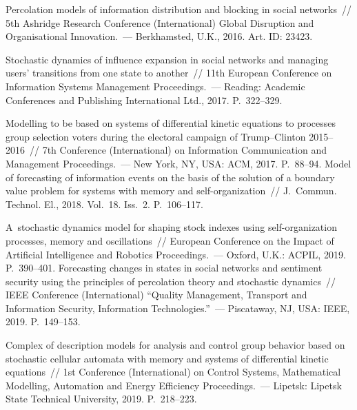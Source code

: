 \begin{multicols}{2}
{{\begin{thebibliography}{99}
 Percolation models of information distribution 
and blocking in social networks~// 5th Ashridge  Research Conference (International) 
Global Disruption and Organisational Innovation.~--- Berkhamsted, U.K., 2016. Art. ID: 
23423.

 Stochastic dynamics of influence expansion in social 
networks and managing users' transitions from one state to another~// 11th European Conference 
on Information Systems Management Proceedings.~--- Reading: Academic Conferences and 
Publishing International Ltd., 2017. P.~322--329. 

 Modelling to be based on systems of 
differential kinetic equations to processes group selection voters during the electoral campaign of 
Trump--Clinton 2015--2016~// 7th Conference (International) on Information Communication and 
Management Proceedings.~--- New York, NY, USA: ACM, 2017. P.~88--94.
 Model of forecasting of 
information events on the basis of the solution of a boundary value problem for systems with 
memory and self-organization~// J.~Commun. Technol. El., 2018. Vol.~18. 
Iss.~2. P.~106--117.


 A~stochastic dynamics model for shaping stock indexes 
using self-organization processes, memory and oscillations~// European Conference on the Impact 
of Artificial Intelligence and Robotics Proceedings.~--- Oxford, U.K.: ACPIL, 2019. P.~390--401.
 Forecasting changes in states in social networks and 
sentiment security using the principles of percolation theory and stochastic dynamics~// IEEE  
Conference (International) ``Quality Management, Transport and Information Security, Information 
Technologies.''~--- Piscataway, NJ, USA: IEEE, 2019. P.~149--153. 


 Complex of description models for analysis and control group 
behavior based on stochastic cellular automata with memory and systems of differential kinetic 
equations~// 1st  Conference (International) on Control Systems, Mathematical Modelling, 
Automation and Energy Efficiency Proceedings.~--- Lipetsk: Lipetsk State Technical 
University, 2019. P.~218--223.


\end{thebibliography}}}
\end{multicols}
